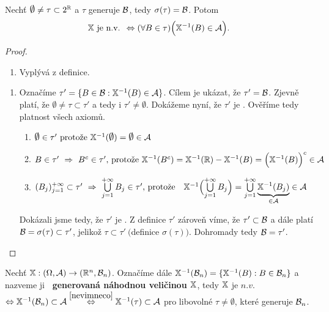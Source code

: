 \begin{theorem}
	\label{nevimneco}
	Nechť $\emptyset \neq \tau \subset 2^\R$ a $\tau$ generuje $\mathcal{B}$, tedy $\sigma(\tau)=\mathcal{B}$. Potom $$\mathbb{X} \text{ je n.v. } \Leftrightarrow (\forall B \in \tau)  \Bigl(\mathbb{X}^{-1}(B) \in \mathcal{A}\Bigr).$$
	\begin{proof}
		\begin{enumerate}[$\Rightarrow$:]
			\item Vyplývá z definice.
		\end{enumerate}
	\begin{enumerate}[$\Leftarrow$:]
			\item Označíme $\tau'=\{ B \in \mathcal{B}: \mathbb{X}^{-1}(B)\in \mathcal{A} \}$. Cílem je ukázat, že $\tau'=\mathcal{B}$. Zjevně platí, že  $\emptyset\neq\tau \subset \tau'$ a tedy i $\tau' \neq \emptyset$. Dokážeme nyní, že $\tau'$ je \salg. Ověříme tedy platnost všech axiomů.
			\begin{enumerate}[	1)]
				\item $ \emptyset \in \tau' \text{ protože } \X^{-1}(\emptyset) = \emptyset \in \Aa $
				\item $ B \in \tau'~\Rightarrow~ B^c \in \tau' \text{, protože } \mathbb{X}^{-1}(B^c)=\mathbb{X}^{-1}(\mathbb{R})-\mathbb{X}^{-1}(B)=\Bigl(\mathbb{X}^{-1}(B)\Bigr)^c \in \mathcal{A}$ %
				\item	$ (B_j)_{j=1}^{+\infty} \subset \tau' ~\Rightarrow~ \bigcup\limits_{j=1}^{+\infty} B_j \in \tau'\text{, protože }~~\mathbb{X}^{-1}\Bigl(\bigcup\limits_{j=1}^{+\infty} B_j\Bigr)=\bigcup\limits_{j=1}^{+\infty} \underbrace{\mathbb{X}^{-1}(B_j)}_{\in \mathcal{A}} \in \mathcal{A} $
			\end{enumerate}
			Dokázali jsme tedy, že $\tau'$ je \salg. Z definice $\tau'$ zároveň víme, že $\tau'\subset\mathcal{B}$ a dále platí $\mathcal{B}=\sigma(\tau) \subset \tau'$, jelikož $\tau \subset \tau'~\bigl($definice $\sigma(\tau)\bigr)$. Dohromady tedy $\mathcal{B} = \tau'$.
		\end{enumerate}
	\end{proof}
\end{theorem}
\begin{define}
	Nechť $\mathbb{X}:(\Omega,\mathcal{A})\to (\mathbb{R}^n,\mathcal{B}_n)$. Označíme dále $\mathbb{X}^{-1}(\mathcal{B}_n)=\{\mathbb{X}^{-1}(B):B \in \mathcal{B}_n\}$ a nazveme ji \textbf{\salg~generovaná náhodnou veličinou $\mathbb{X}$}, tedy \newline $\mathbb{X}$ je $n.v.$ $\Leftrightarrow \mathbb{X}^{-1}(\mathcal{B}_n) \subset \mathcal{A} \stackrel{\ref{nevimneco}}{\Leftrightarrow} \mathbb{X}^{-1}(\tau) \subset \mathcal{A}$ pro libovolné $\tau \neq \emptyset$, které generuje $\mathcal{B}_n$.
\end{define}
